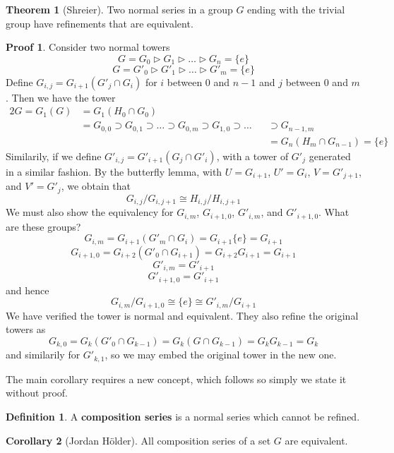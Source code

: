 \documentclass[12pt]{amsbook}
\theoremstyle{definition}
\newtheorem{theorem}{Theorem}[chapter]
\newtheorem{corollary}[theorem]{Corollary}
\newtheorem{definition}{Definition}
\newtheorem*{prf}{Proof}
\begin{document}
\begin{theorem}[Shreier]
    Two normal series in a group $G$ ending with the trivial group have refinements that are equivalent.
\end{theorem}
\begin{prf}
    Consider two normal towers
    \[ G = G_0 \rhd G_1 \rhd \dots \rhd G_n = \{ e \} \]
    \[ G = G'_0 \rhd G'_1 \rhd \dots \rhd G'_m = \{ e \} \]
    Define $G_{i,j} = G_{i+1}(G'_j \cap G_i)$ for $i$ between 0 and $n-1$ and $j$ between 0 and $m$. Then we have the tower
    \begin{alignat*}{2}
    G = G_1(G) &= G_1(H_0 \cap G_0) &\\
               &= G_{0,0} \supset G_{0,1} \supset \dots \supset G_{0,m} \supset G_{1,0} \supset \dots &&\supset G_{n-1,m}\\
                &           &&= G_n(H_m \cap G_{n-1}) = \{ e \}
    \end{alignat*}
    Similarily, if we define $G'_{i,j} = G'_{i+1}(G_j \cap G'_i)$, with a tower of $G'_j$ generated in a similar fashion. By the butterfly lemma, with $U = G_{i+1}$, $U' = G_i$, $V = G'_{j+1}$, and $V' = G'_j$, we obtain that
    \[ G_{i,j}/G_{i,j+1} \cong H_{i,j}/H_{i,j+1} \]
    We must also show the equivalency for $G_{i,m}$, $G_{i+1,0}$, $G'_{i,m}$, and $G'_{i+1,0}$. What are these groups?
    \[ G_{i,m} = G_{i+1}(G'_m \cap G_i) = G_{i+1}\{e\} = G_{i+1} \]
    \[ G_{i+1,0} = G_{i+2}(G'_0 \cap G_{i+1}) = G_{i+2}G_{i+1} = G_{i+1} \]
    \[ G'_{i,m} = G'_{i+1} \]
    \[ G'_{i+1,0} = G'_{i+1} \]
    and hence
    \[ G_{i,m}/G_{i+1,0} \cong \{e\} \cong G'_{i,m}/G_{i+1} \]
    We have verified the tower is normal and equivalent. They also refine the original towers as
    \[ G_{k,0} = G_k(G'_0 \cap G_{k-1}) = G_k(G \cap G_{k-1}) = G_kG_{k-1} = G_k \]
    and similarily for $G'_{k,1}$, so we may embed the original tower in the new one.
\end{prf}

The main corollary requires a new concept, which follows so simply we state it without proof.

\begin{definition}
    A {\bf composition series} is a normal series which cannot be refined.
\end{definition}

\begin{corollary}[Jordan H\"{o}lder]
    All composition series of a set $G$ are equivalent.
\end{corollary}
\end{document}
